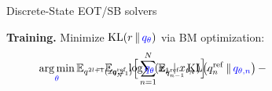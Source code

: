\documentclass[final]{beamer}
\DeclareMathOperator*{\argmin}{arg\,min}
\newcommand{\KL}[2]{\operatorname{KL}\!\left(#1\,\Vert\,#2\right)}
\newlength{\sepwidth}
\newlength{\colwidth}
\newcommand{\separatorcolumn}{\begin{column}{\sepwidth}\end{column}}
\begin{document}
\begin{frame}[t]
\begin{columns}[t]
\begin{column}{\colwidth}
\begin{block}{Discrete-State EOT/SB solvers}
\begin{minipage}[t]{0.48\linewidth}
            \textbf{Training.} Minimize $\KL{r}{{\color{blue}q_\theta}}$ via BM optimization:
            \vspace{-1mm}
            \begin{multline*}
                \argmin_{\color{blue}\theta}\mathbb{E}_{q^{2l+1}(x_0,x_1)}
                \Big[
                \sum_{n=1}^{N}
                \mathbb{E}_{q^{\mathrm{ref}}_{n-1}}
                \KL{q^{\mathrm{ref}}_{n}}{{\color{blue}q_{\theta,n}}}
                -
                \\[-10mm]
                -
                \mathbb{E}_{q^{\mathrm{ref}}_{N}}
                \log {\color{blue}q_{\theta}}(x_1\mid x_{t_N})
                \Big].
            \end{multline*}
        \end{minipage}        
    \end{block}

\end{column}

\separatorcolumn

\begin{column}{\colwidth}


\end{column}
\end{columns}
\end{frame}
\end{document}
